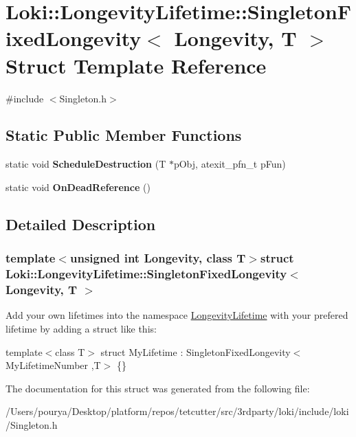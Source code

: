 \hypertarget{classLoki_1_1LongevityLifetime_1_1SingletonFixedLongevity}{}\section{Loki\+:\+:Longevity\+Lifetime\+:\+:Singleton\+Fixed\+Longevity$<$ Longevity, T $>$ Struct Template Reference}
\label{classLoki_1_1LongevityLifetime_1_1SingletonFixedLongevity}


{\ttfamily \#include $<$Singleton.\+h$>$}

\subsection*{Static Public Member Functions}
\begin{DoxyCompactItemize}
\item 
\hypertarget{classLoki_1_1LongevityLifetime_1_1SingletonFixedLongevity_a1d2485084acb6833205c603131c4ede2}{}static void {\bfseries Schedule\+Destruction} (T $\ast$p\+Obj, atexit\+\_\+pfn\+\_\+t p\+Fun)\label{classLoki_1_1LongevityLifetime_1_1SingletonFixedLongevity_a1d2485084acb6833205c603131c4ede2}

\item 
\hypertarget{classLoki_1_1LongevityLifetime_1_1SingletonFixedLongevity_a7469345a20917d5cb1b5312e77af71e2}{}static void {\bfseries On\+Dead\+Reference} ()\label{classLoki_1_1LongevityLifetime_1_1SingletonFixedLongevity_a7469345a20917d5cb1b5312e77af71e2}

\end{DoxyCompactItemize}


\subsection{Detailed Description}
\subsubsection*{template$<$unsigned int Longevity, class T$>$struct Loki\+::\+Longevity\+Lifetime\+::\+Singleton\+Fixed\+Longevity$<$ Longevity, T $>$}

Add your own lifetimes into the namespace \textquotesingle{}\hyperlink{namespaceLongevityLifetime}{Longevity\+Lifetime}\textquotesingle{} with your prefered lifetime by adding a struct like this\+:

template$<$class T$>$ struct My\+Lifetime \+: Singleton\+Fixed\+Longevity$<$ My\+Lifetime\+Number ,\+T$>$ \{\} 

The documentation for this struct was generated from the following file\+:\begin{DoxyCompactItemize}
\item 
/\+Users/pourya/\+Desktop/platform/repos/tetcutter/src/3rdparty/loki/include/loki/Singleton.\+h\end{DoxyCompactItemize}
